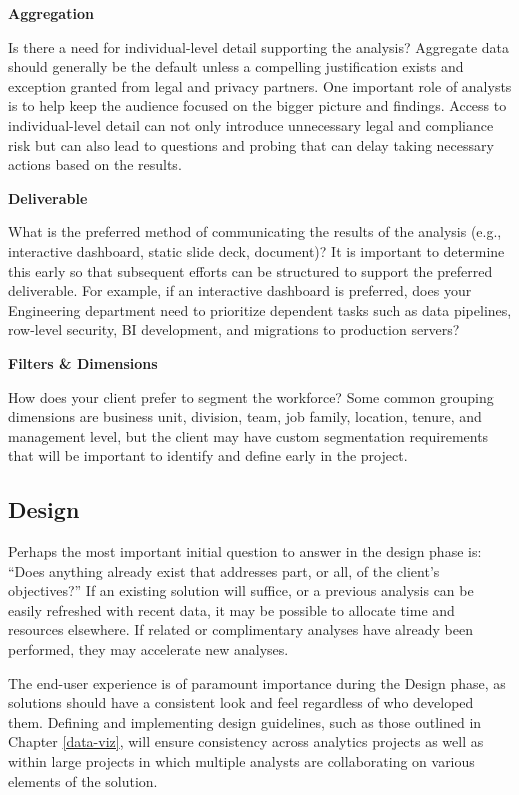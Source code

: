 \documentclass[
]{book}
\begin{document}
\textbf{Aggregation}

Is there a need for individual-level detail supporting the analysis? Aggregate data should generally be the default unless a compelling justification exists and exception granted from legal and privacy partners. One important role of analysts is to help keep the audience focused on the bigger picture and findings. Access to individual-level detail can not only introduce unnecessary legal and compliance risk but can also lead to questions and probing that can delay taking necessary actions based on the results.

\textbf{Deliverable}

What is the preferred method of communicating the results of the analysis (e.g., interactive dashboard, static slide deck, document)? It is important to determine this early so that subsequent efforts can be structured to support the preferred deliverable. For example, if an interactive dashboard is preferred, does your Engineering department need to prioritize dependent tasks such as data pipelines, row-level security, BI development, and migrations to production servers?

\textbf{Filters \& Dimensions}

How does your client prefer to segment the workforce? Some common grouping dimensions are business unit, division, team, job family, location, tenure, and management level, but the client may have custom segmentation requirements that will be important to identify and define early in the project.

\hypertarget{design}{%
\subsection{Design}\label{design}}

Perhaps the most important initial question to answer in the design phase is: ``Does anything already exist that addresses part, or all, of the client's objectives?'' If an existing solution will suffice, or a previous analysis can be easily refreshed with recent data, it may be possible to allocate time and resources elsewhere. If related or complimentary analyses have already been performed, they may accelerate new analyses.

The end-user experience is of paramount importance during the Design phase, as solutions should have a consistent look and feel regardless of who developed them. Defining and implementing design guidelines, such as those outlined in Chapter \ref{data-viz}, will ensure consistency across analytics projects as well as within large projects in which multiple analysts are collaborating on various elements of the solution.
\end{document}
